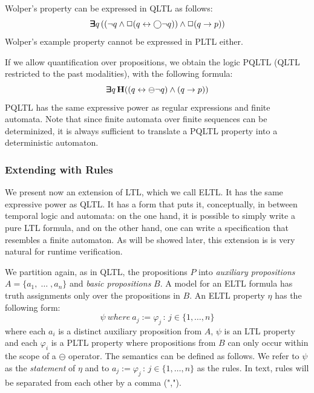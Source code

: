 \noindent
Wolper's property can be expressed in QLTL as follows:
\begin{equation} \label{form0} \bm{\exists}\kern-0.6em\bm{\exists} q \,
( (  \neg q \wedge \Box (q \leftrightarrow \bigcirc \neg q )  )  \wedge \Box (q \rightarrow p ) )\end{equation}
Wolper's example property cannot be expressed in PLTL either.

If we allow
quantification over propositions, we obtain the logic PQLTL
(QLTL restricted to the past modalities), with the following formula:
\begin{equation} \label{form1} \bm{\exists}\kern-0.6em\bm{\exists} q \,
{\bf H} (( q \leftrightarrow \ominus \neg q )   \wedge (q \rightarrow p ) )\end{equation}
PQLTL has the same expressive
power as regular expressions and finite automata.
Note that since finite automata over finite sequences can be determinized, it is always sufficient to translate a
PQLTL property into a deterministic
automaton.


\subsubsection{Extending with Rules}

We present now an extension of LTL, which we call ELTL. It has the same
expressive power as  QLTL.
It has a form that puts it, conceptually, in between temporal
logic and automata: on the one hand, it is possible to simply write
a pure LTL formula, and on the other hand, one can write a specification that resembles a finite automaton. As will be showed later, this extension is
is very natural for runtime verification.

We partition again, as in QLTL, the propositions $P$ into
{\em auxiliary propositions} $A = \{ a_1 , \; \ldots\; , a_n \}$
and {\em basic propositions} $B$. A model for an ELTL formula has truth assignments only over the propositions in $B$.
An ELTL property $\eta$ has the following form: 
\begin{equation} \label{ELTL}
\psi \mathit{\ where\ } a_j  := \varphi_j \, : \, 
 {j \in \{1, \ldots , n\}} \end{equation}
where each $a_i$ is a distinct auxiliary proposition from $A$,
$\psi$ is an LTL property and each $\varphi_i$ 
is a PLTL property where propositions from $B$ can
only occur within the scope of a $\ominus$ operator.
The semantics can be defined as follows. We refer to $\psi$
as the {\em statement} of $\eta$ and to 
$a_j  := \varphi_j \, : \, 
 {j \in \{1, \ldots , n\}}$ as the rules. In text, rules
 will be separated from each other by a comma (",").

